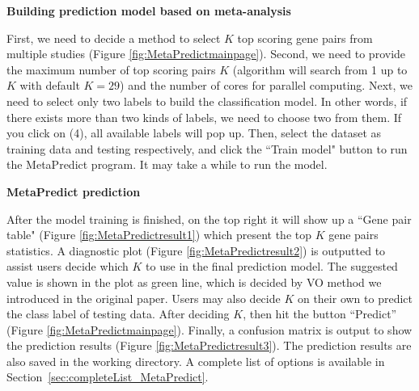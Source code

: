 \begin{steps}
\item \textbf{Building prediction model based on meta-analysis}

First, we need to decide a method to select $K$ top scoring gene pairs from multiple studies (Figure \ref{fig:MetaPredictmainpage}). 
Second, we need to provide the maximum number of top scoring pairs $K$ (algorithm will search from 1 up to $K$ with default $K = 29$) and the number of cores for parallel computing. 
Next, we need to select only two labels to build the classification model. 
In other words, if there exists more than two kinds of labels, we need to choose two from them. 
If you click on {\color{red} (4)}, all available labels will pop up.
Then, select the dataset as training data and testing respectively, 
and click the ``Train model" button to run the MetaPredict program. 
It may take a while to run the model.

\item \textbf{MetaPredict prediction}

After the model training is finished, on the top right it will show up a ``Gene pair table" (Figure \ref{fig:MetaPredictresult1}) which present the top $K$ gene pairs statistics. 
A diagnostic plot (Figure \ref{fig:MetaPredictresult2}) is outputted to assist users decide which $K$ to use in the final prediction model. 
The suggested value is shown in the plot as green line, which is decided by VO method we introduced in the original paper. Users may also decide $K$ on their own to predict the class label of testing data. 
After deciding $K$, then hit the button ``Predict'' (Figure \ref{fig:MetaPredictmainpage}). 
Finally, a confusion matrix is output to show the prediction results (Figure \ref{fig:MetaPredictresult3}).
The prediction results are also saved in the working directory.
A complete list of options is available in Section~\ref{sec:completeList_MetaPredict}.

\end{steps}

